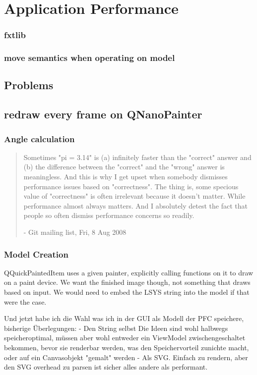 \chapter{Application Performance}

\subsection{fxtlib}
\subsection{move semantics when operating on model}
\section{Problems}
\section{redraw every frame on QNanoPainter}

\subsection{Angle calculation}
\begin{quote}
Sometimes "pi = 3.14" is (a) infinitely faster than the "correct" answer and (b) the difference between the "correct" and the "wrong" answer is meaningless. And this is why I get upset when somebody dismisses performance issues based on "correctness". The thing is, some specious value of "correctness" is often irrelevant because it doesn't matter. While performance almost always matters. And I absolutely detest the fact that people so often dismiss performance concerns so readily.

- Git mailing list, Fri, 8 Aug 2008
\end{quote}
\subsection{Model Creation}
QQuickPaintedItem uses a given painter, explicitly calling functions on it to draw on a paint device.
We want the finished image though, not something that draws based on input. We would need to embed the LSYS string into the model if that were the case.

Und jetzt habe ich die Wahl was ich in der GUI als Modell der PFC speichere, bisherige Überlegungen:
- Den String selbst
Die Ideen sind wohl halbwegs speicheroptimal, müssen aber wohl entweder ein ViewModel zwischengeschaltet bekommen, bevor sie renderbar werden, was den Speichervorteil zunichte macht, oder auf ein Canvasobjekt "gemalt" werden
- Als SVG. Einfach zu rendern, aber den SVG overhead zu parsen ist sicher alles andere als performant.

